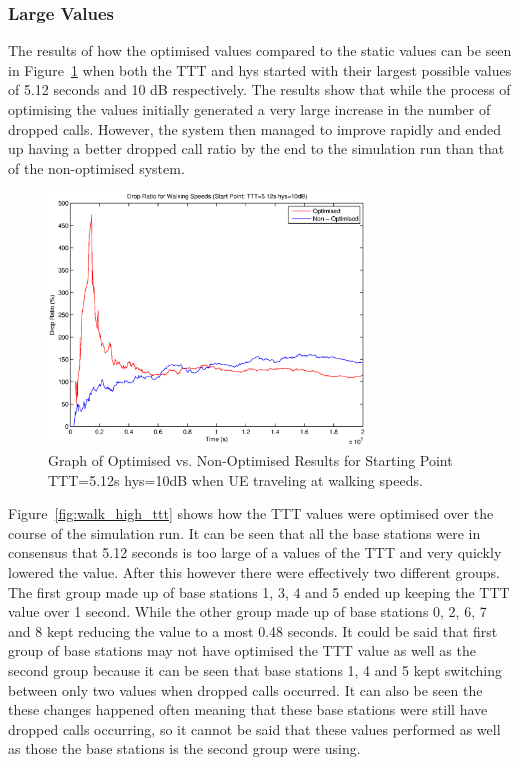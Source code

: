 \subsubsection*{Large Values}
The results of how the optimised values compared to the static values can be seen in Figure~\ref{fig:walk_high_drop} when both the TTT and hys started with their largest possible values of 5.12 seconds and 10 dB respectively. The results show that while the process of optimising the values initially generated a very large increase in the number of dropped calls. However, the system then managed to improve rapidly and ended up having a better dropped call ratio by the end to the simulation run than that of the non-optimised system.
\begin{figure}[H]
  \begin{center}
    	  \includegraphics[width=0.75\textwidth]{figures/walking_figures/high/long_drop.eps}
    \end{center}
    \caption{Graph of Optimised vs. Non-Optimised Results for Starting Point TTT=5.12s hys=10dB when UE traveling at walking speeds.}
    \label{fig:walk_high_drop}
\end{figure}
Figure~\ref{fig:walk_high_ttt} shows how the TTT values were optimised over the course of the simulation run. It can be seen that all the base stations were in consensus that 5.12 seconds is too large of a values of the TTT and very quickly lowered the value. After this however there were effectively two different groups. The first group made up of base stations 1, 3, 4 and 5 ended up keeping the TTT value over 1 second. While the other group made up of base stations 0, 2, 6, 7 and 8 kept reducing the value to a most 0.48 seconds. It could be said that first group of base stations may not have optimised the TTT value as well as the second group because it can be seen that base stations 1, 4 and 5 kept switching between only two values when dropped calls occurred. It can also be seen the these changes happened often meaning that these base stations were still have dropped calls occurring, so it cannot be said that these values performed as well as those the base stations is the second group were using.
